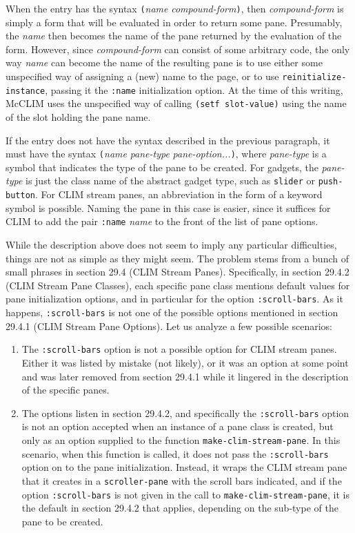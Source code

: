 When the entry has the syntax \texttt{(}\textit{name}
\textit{compound-form}\texttt{)}, then \textit{compound-form} is
simply a form that will be evaluated in order to return some pane.
Presumably, the \textit{name} then becomes the name of the pane
returned by the evaluation of the form.  However, since
\textit{compound-form} can consist of some arbitrary code, the only
way \textit{name} can become the name of the resulting pane is to use
either some unspecified way of assigning a (new) name to the page, or
to use \texttt{reinitialize-instance}, passing it the \texttt{:name}
initialization option.  At the time of this writing, McCLIM uses the
unspecified way of calling \texttt{(setf slot-value)} using the name
of the slot holding the pane name.

If the entry does not have the syntax described in the previous
paragraph, it must have the syntax \texttt{(}\textit{name}
\textit{pane-type} \textit{pane-option...}\texttt{)}, where
\textit{pane-type} is a symbol that indicates the type of the pane to
be created.  For gadgets, the \textit{pane-type} is just the class
name of the abstract gadget type, such as \texttt{slider} or
\texttt{push-button}.  For CLIM stream panes, an abbreviation in the
form of a \commonlisp{} keyword symbol is possible.  Naming the pane
in this case is easier, since it suffices for CLIM to add the pair
\texttt{:name} \textit{name} to the front of the list of pane
options.

While the description above does not seem to imply any particular
difficulties, things are not as simple as they might seem.  The
problem stems from a bunch of small phrases in section 29.4 (CLIM
Stream Panes).  Specifically, in section 29.4.2 (CLIM Stream Pane
Classes), each specific pane class mentions default values for pane
initialization options, and in particular for the option
\texttt{:scroll-bars}.  As it happens, \texttt{:scroll-bars} is not
one of the possible options mentioned in section 29.4.1 (CLIM Stream
Pane Options).  Let us analyze a few possible scenarios:

\begin{enumerate}
\item The \texttt{:scroll-bars} option is not a possible option for
  CLIM stream panes.  Either it was listed by mistake (not likely), or
  it was an option at some point and was later removed from section
  29.4.1 while it lingered in the description of the specific panes.
\item The options listen in section 29.4.2, and specifically the
  \texttt{:scroll-bars} option is not an option accepted when an
  instance of a pane class is created, but only as an option supplied
  to the function \texttt{make-clim-stream-pane}.  In this scenario,
  when this function is called, it does not pass the
  \texttt{:scroll-bars} option on to the pane initialization.
  Instead, it wraps the CLIM stream pane that it creates in a
  \texttt{scroller-pane} with the scroll bars indicated, and if the
  option \texttt{:scroll-bars} is not given in the call to
  \texttt{make-clim-stream-pane}, it is the default in section 29.4.2
  that applies, depending on the sub-type of the pane to be created.
\end{enumerate}

